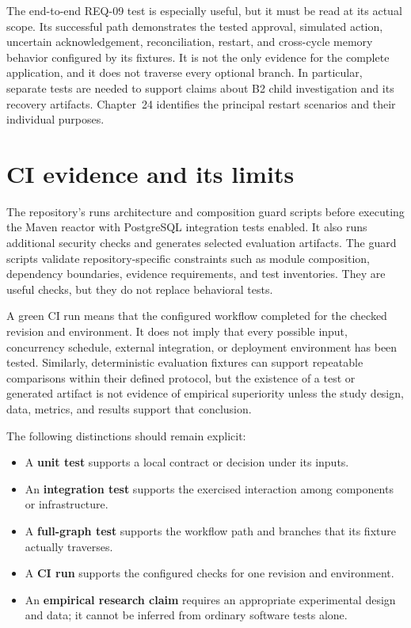 The end-to-end REQ-09 test is especially useful, but it must be read at its actual scope. Its successful path demonstrates the tested approval, simulated action, uncertain acknowledgement, reconciliation, restart, and cross-cycle memory behavior configured by its fixtures. It is not the only evidence for the complete application, and it does not traverse every optional branch. In particular, separate tests are needed to support claims about B2 child investigation and its recovery artifacts. Chapter~24 identifies the principal restart scenarios and their individual purposes.

\section{CI evidence and its limits}

The repository's  runs architecture and composition guard scripts before executing the Maven reactor with PostgreSQL integration tests enabled. It also runs additional security checks and generates selected evaluation artifacts. The guard scripts validate repository-specific constraints such as module composition, dependency boundaries, evidence requirements, and test inventories. They are useful checks, but they do not replace behavioral tests.

A green CI run means that the configured workflow completed for the checked revision and environment. It does not imply that every possible input, concurrency schedule, external integration, or deployment environment has been tested. Similarly, deterministic evaluation fixtures can support repeatable comparisons within their defined protocol, but the existence of a test or generated artifact is not evidence of empirical superiority unless the study design, data, metrics, and results support that conclusion.

The following distinctions should remain explicit:
\begin{itemize}
  \item A \textbf{unit test} supports a local contract or decision under its inputs.
  \item An \textbf{integration test} supports the exercised interaction among components or infrastructure.
  \item A \textbf{full-graph test} supports the workflow path and branches that its fixture actually traverses.
  \item A \textbf{CI run} supports the configured checks for one revision and environment.
  \item An \textbf{empirical research claim} requires an appropriate experimental design and data; it cannot be inferred from ordinary software tests alone.
\end{itemize}

